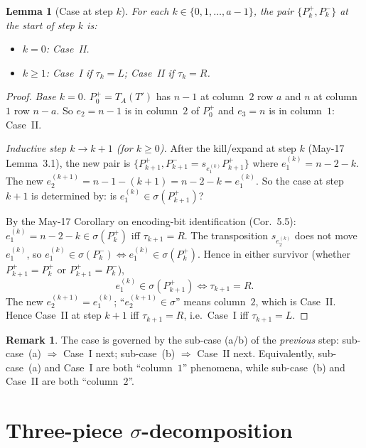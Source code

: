 \documentclass[11pt]{article}
\newtheorem{lemma}[theorem]{Lemma}
\theoremstyle{definition}
\newtheorem{remark}[theorem]{Remark}
\begin{document}
\begin{lemma}[Case at step $k$]\label{lem:case}
For each $k\in\{0,1,\ldots,a-1\}$, the pair $\{P_k^+,P_k^-\}$ at the
start of step $k$ is:
\begin{itemize}[leftmargin=2em,topsep=0.3em,itemsep=0.2em]
\item $k=0$: Case~II.
\item $k\ge 1$: Case~I if $\tau_k=L$; Case~II if $\tau_k=R$.
\end{itemize}
\end{lemma}

\begin{proof}
\emph{Base $k=0$.}  $P_0^+=T_A(T')$ has $n-1$ at column~$2$ row $a$
and $n$ at column~$1$ row $n-a$.  So $e_2=n-1$ is in column~$2$ of
$P_0^+$ and $e_3=n$ is in column~$1$: Case~II.

\emph{Inductive step $k\to k+1$ (for $k\ge 0$).}  After the
kill/expand at step $k$ (May-17 Lemma~3.1), the new pair is
$\{P_{k+1}^+,P_{k+1}^-=s_{e_1^{(k)}}P_{k+1}^+\}$ where
$e_1^{(k)}=n-2-k$.  The new $e_2^{(k+1)}=n-1-(k+1)=n-2-k=e_1^{(k)}$.
So the case at step $k+1$ is determined by: is
$e_1^{(k)}\in\sigma(P_{k+1}^+)$?

By the May-17 Corollary on encoding-bit identification (Cor.~5.5):
$e_1^{(k)}=n-2-k\in\sigma(P_k^+)$ iff $\tau_{k+1}=R$.  The transposition
$s_{e_2^{(k)}}$ does not move $e_1^{(k)}$, so
$e_1^{(k)}\in\sigma(P_k^-)\iff e_1^{(k)}\in\sigma(P_k^+)$.  Hence in
either survivor (whether $P_{k+1}^+=P_k^+$ or $P_{k+1}^+=P_k^-$),
\[
   e_1^{(k)}\in\sigma(P_{k+1}^+)
   \iff
   \tau_{k+1}=R.
\]
The new $e_2^{(k+1)}=e_1^{(k)}$; ``$e_2^{(k+1)}\in\sigma$'' means
column~$2$, which is Case~II.  Hence Case~II at step $k+1$ iff
$\tau_{k+1}=R$, i.e.\ Case~I iff $\tau_{k+1}=L$.
\end{proof}

\begin{remark}
The case is governed by the sub-case (a/b) of the \emph{previous}
step: sub-case~(a) $\Rightarrow$ Case~I next; sub-case~(b)
$\Rightarrow$ Case~II next.  Equivalently, sub-case~(a) and Case~I
are both ``column~$1$'' phenomena, while sub-case~(b) and Case~II
are both ``column~$2$''.
\end{remark}

\section{Three-piece $\sigma$-decomposition}\label{sec:decomp}
\end{document}
